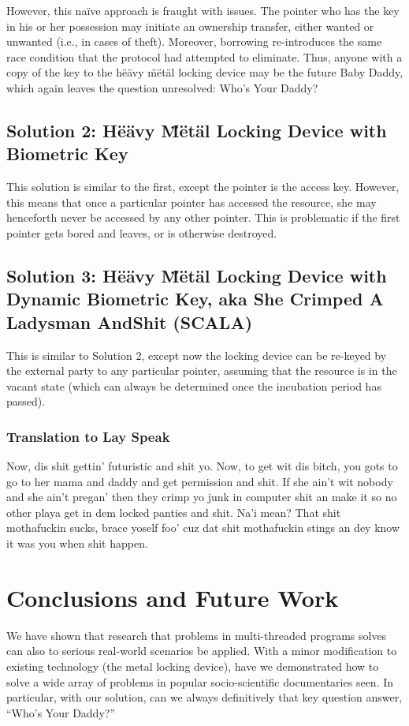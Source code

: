 \documentclass[preprint,10pt]{sigplanconf}
\begin{document}
However, this na\"{i}ve approach is fraught with issues. The pointer who has the key in his or her possession may initiate an ownership transfer, either wanted or unwanted (i.e., in cases of theft). Moreover, borrowing re-introduces the same race condition that the protocol had attempted to eliminate. Thus, anyone with a copy of the key to the h\"{e}\"{a}vy \"{m}\"{e}t\"{a}l locking device may be the future Baby Daddy, which again leaves the question unresolved: Who's Your Daddy?

\subsection{Solution 2: H\"{e}\"{a}vy \"{M}\"{e}t\"{a}l Locking Device with Biometric Key}
This solution is similar to the first, except the pointer is the access key. However, this means that once a particular pointer has accessed the resource, she may henceforth never be accessed by any other pointer. This is problematic if the first pointer gets bored and leaves, or is otherwise destroyed.

\subsection{Solution 3: H\"{e}\"{a}vy \"{M}\"{e}t\"{a}l Locking Device with Dynamic Biometric Key, aka She Crimped A Ladysman AndShit (SCALA)}
This is similar to Solution 2, except now the locking device can be re-keyed by the external party to any particular pointer, assuming that the resource is in the vacant state (which can always be determined once the incubation period has passed).

\subsubsection{Translation to Lay Speak}
Now, dis shit gettin' futuristic and shit yo. Now, to get wit dis bitch, you gots to go to her mama and daddy and get permission and shit. If she ain't wit nobody and she ain't pregan' then they crimp yo junk in computer shit an make it so no other playa get in dem locked panties and shit. Na'i mean? That shit mothafuckin sucks, brace yoself foo' cuz dat shit mothafuckin stings an dey know it was you when shit happen.

\section{Conclusions and Future Work}
We have shown that research that problems in multi-threaded programs solves can also to serious real-world scenarios be applied. With a minor modification to existing technology (the metal locking device), have we demonstrated how to solve a wide array of problems in popular socio-scientific documentaries seen. In particular, with our solution, can we always definitively that key question answer, ``Who's Your Daddy?''
\end{document}
